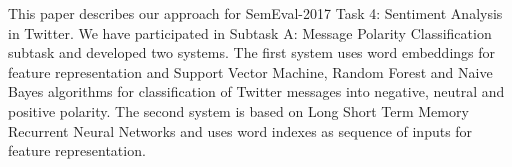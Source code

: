 This paper describes our approach for SemEval-2017 Task 4: Sentiment Analysis in Twitter. We have participated in Subtask A: Message Polarity Classification subtask and  developed two systems. The first system  uses  word embeddings for feature representation and Support Vector Machine, Random Forest and Naive Bayes algorithms for classification of Twitter messages into negative, neutral and positive polarity. The second system is based on Long Short Term Memory Recurrent Neural Networks and uses word indexes as sequence of inputs for feature representation.
